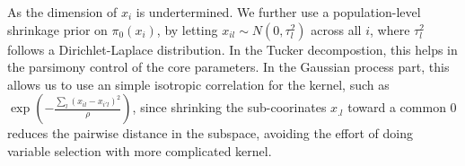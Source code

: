 \documentclass[11pt]{article}
\begin{document}
As the dimension of $x_i$ is undertermined. We further use a population-level shrinkage prior on $\pi_0(x_i)$, by letting $x_{il}\sim N(0, \tau_l^2)$ across all $i$, where $\tau^2_l$ follows a Dirichlet-Laplace distribution. In the Tucker decompostion, this helps in the parsimony control of the core parameters. In the Gaussian process part, this allows us to use an simple isotropic correlation for the kernel, such as $\exp( - \frac{\sum_l (x_{il}-x_{i'l})^2}{\rho})$, since shrinking the sub-coorinates $x_{.l}$ toward a common $0$ reduces the pairwise distance in the subspace, avoiding the effort of doing variable selection with more complicated kernel.
\end{document}
